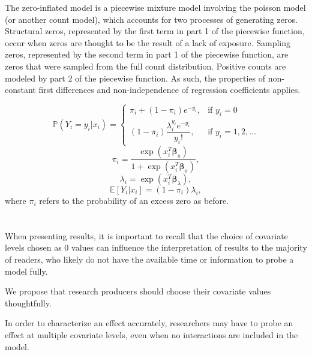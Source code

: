\documentclass[jou, apacite]{apa6}
\begin{document}
The zero-inflated model is a piecewise mixture model involving the poisson model (or another count model), which accounts for two processes of generating zeros. Structural zeros, represented by the first term in part 1 of the piecewise function, occur when zeros are thought to be the result of a lack of exposure. Sampling zeros, represented by the second term in part 1 of the piecewise function, are zeros that were sampled from the full count distribution. Positive counts are modeled by part 2 of the piecewise function. As such, the properties of non-constant first differences and non-independence of regression coefficients applies. 


\begin{equation} \label{zip1}
\mathbb{P}(Y_i = y_i|x_i) =
  \begin{cases}
    \pi_i + (1 - \pi_i)e^{-y_i}, & \text{if } y_i = 0 \\
    (1 - \pi_i) \dfrac{\lambda_i^{y_i}e^{-y_i}}{y_i!}, & \text{if } y_i = 1, 2, \dots
  \end{cases}
\end{equation}
\begin{equation} \label{zip2}
\pi_i = \dfrac{\exp (x_i^T \bm{\beta}_{\pi})}{1 + \exp (x_i^T \bm{\beta}_{\pi})},
\end{equation}
\begin{equation} \label{zip3}
\lambda_i = \exp (x_i^T \bm{\beta}_{\lambda}),
\end{equation}
\begin{equation} \label{zip4}
\mathbb{E}[Y_i|x_i] = (1 - \pi_i)\lambda_i,
\end{equation}
where $\pi_i$ refers to the probability of an excess zero as before.


\section{}
When presenting results, it is important to recall that the choice of covariate levels chosen as 0 values can influence the interpretation of results to the majority of readers, who likely do not have the available time or information to probe a model fully. 

We propose that research producers should choose their covariate values thoughtfully. 

In order to characterize an effect accurately, researchers may have to probe an effect at multiple covariate levels, even when no interactions are included in the model.
\end{document}
